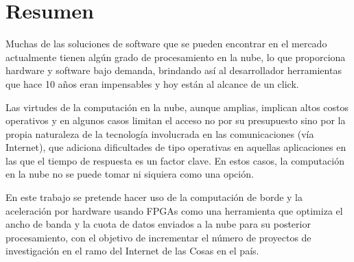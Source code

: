 \chapter*{Resumen}

Muchas de las soluciones de software que se pueden encontrar en el mercado actualmente tienen algún grado de procesamiento en la nube, lo que proporciona hardware y software bajo demanda, brindando así al desarrollador herramientas que hace 10 años eran impensables y hoy están al alcance de un click.

Las virtudes de la computación en la nube, aunque amplias, implican altos costos operativos y en algunos casos limitan el acceso no por su presupuesto sino por la propia naturaleza de la tecnología involucrada en las comunicaciones (vía Internet), que adiciona dificultades de tipo operativas en aquellas aplicaciones en las que el tiempo de respuesta es un factor clave. En estos casos, la computación en la nube no se puede tomar ni siquiera como una opción.

En este trabajo se pretende hacer uso de la computación de borde y la aceleración por hardware usando FPGAs como una herramienta que optimiza el ancho de banda y la cuota de datos enviados a la nube para su posterior procesamiento, con el objetivo de incrementar el número de proyectos de investigación en el ramo del Internet de las Cosas en el país.
